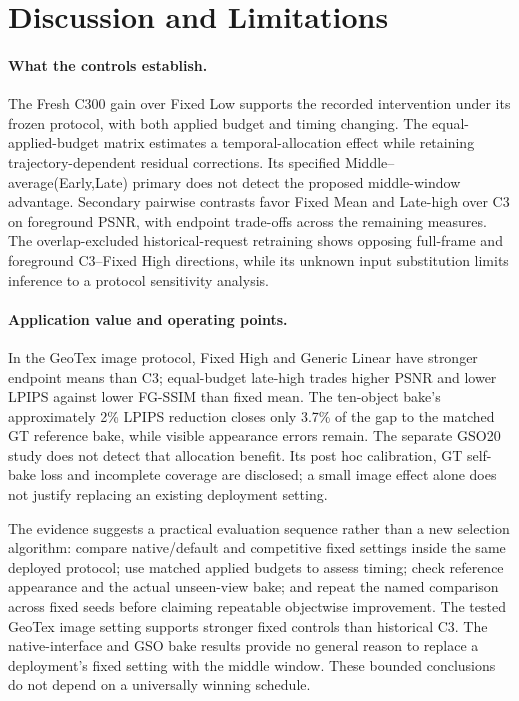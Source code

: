 \documentclass[times,twocolumn,final]{elsarticle}
\begin{document}
\FloatBarrier
\section{Discussion and Limitations}
\label{sec:limitations}

\paragraph{What the controls establish.}
The Fresh C300 gain over Fixed Low supports the recorded intervention under its frozen protocol, with both applied budget and timing changing. The equal-applied-budget matrix estimates a temporal-allocation effect while retaining trajectory-dependent residual corrections. Its specified Middle--average(Early,Late) primary does not detect the proposed middle-window advantage. Secondary pairwise contrasts favor Fixed Mean and Late-high over C3 on foreground PSNR, with endpoint trade-offs across the remaining measures. The overlap-excluded historical-request retraining shows opposing full-frame and foreground C3--Fixed High directions, while its unknown input substitution limits inference to a protocol sensitivity analysis.

\paragraph{Application value and operating points.}
In the GeoTex image protocol, Fixed High and Generic Linear have stronger endpoint means than C3; equal-budget late-high trades higher PSNR and lower LPIPS against lower FG-SSIM than fixed mean. The ten-object bake's approximately 2\% LPIPS reduction closes only 3.7\% of the gap to the matched GT reference bake, while visible appearance errors remain. The separate GSO20 study does not detect that allocation benefit. Its post hoc calibration, GT self-bake loss and incomplete coverage are disclosed; a small image effect alone does not justify replacing an existing deployment setting.

The evidence suggests a practical evaluation sequence rather than a new selection algorithm: compare native/default and competitive fixed settings inside the same deployed protocol; use matched applied budgets to assess timing; check reference appearance and the actual unseen-view bake; and repeat the named comparison across fixed seeds before claiming repeatable objectwise improvement. The tested GeoTex image setting supports stronger fixed controls than historical C3. The native-interface and GSO bake results provide no general reason to replace a deployment's fixed setting with the middle window. These bounded conclusions do not depend on a universally winning schedule.
\end{document}
